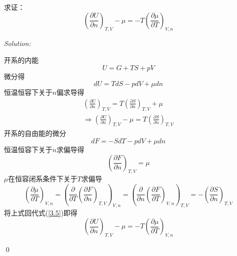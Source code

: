 \documentclass[12pt,a4paper]{article}
\newenvironment{problem}[2][Problem]{\begin{trivlist}
\item[\hskip \labelsep {\bfseries #1}\hskip \labelsep {\bfseries #2.}]}{\end{trivlist}}
\newenvironment{sol}
    {\emph{Solution:}
    }
    {
    \qed
    }
\begin{document}
\begin{problem}{3.5}
求证：
\[
\left(\frac{\partial U}{\partial n}\right)_{T,V}-\mu=-T\left(\frac{\partial\mu}{\partial T}\right)_{V,n}
\]
\end{problem}
\begin{sol}
开系的内能
\begin{equation}
U=G+TS+pV
\end{equation}
微分得
\begin{equation}
dU=TdS-pdV+\mu dn
\end{equation}
恒温恒容下关于$n$偏求导得
\begin{gather}
\left(\frac{\partial U}{\partial n}\right)_{T,V}=T\left(\frac{\partial S}{\partial n}\right)_{T,V}+\mu\\
\label{3.5}\Longrightarrow\left(\frac{\partial U}{\partial n}\right)_{T,V}-\mu=T\left(\frac{\partial S}{\partial n}\right)_{T,V}
\end{gather}
开系的自由能的微分
\begin{equation}
dF=-SdT-pdV+\mu dn
\end{equation}
恒温恒容下关于$n$求偏导得
\begin{equation}
\left(\frac{\partial F}{\partial n}\right)_{T,V}=\mu
\end{equation}
$\mu$在恒容闭系条件下关于$T$求偏导
\begin{equation}
\left(\frac{\partial\mu}{\partial T}\right)_{V,n}=\left(\frac{\partial}{\partial T}\left(\frac{\partial F}{\partial n}\right)_{T,V}\right)_{V,n}=\left(\frac{\partial}{\partial n}\left(\frac{\partial F}{\partial T}\right)_{V,n}\right)_{T,V}=-\left(\frac{\partial S}{\partial n}\right)_{T,V}
\end{equation}
将上式回代式(\ref{3.5})即得
\begin{equation}
\left(\frac{\partial U}{\partial n}\right)_{T,V}-\mu=-T\left(\frac{\partial\mu}{\partial T}\right)_{V,n}
\end{equation}
\end{sol}
\end{document}

